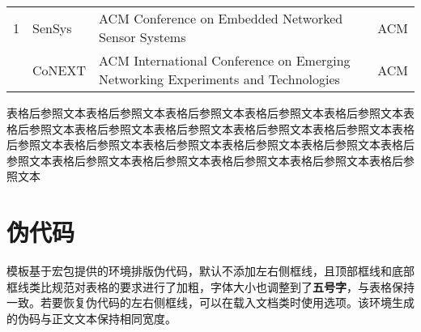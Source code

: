 \documentclass[doctor, vlined]{DissertUESTC}
\begin{document}
\begin{longtable}{m{2em}<{\centering} p{4.5em} p{15em} p{6em}}
		1 & SenSys & ACM Conference on Embedded Networked Sensor Systems & ACM \\
		\pagebreak  %
		2 & CoNEXT & ACM International Conference on Emerging Networking Experiments and Technologies & ACM \\
		
		
		
	\end{longtable}

	表格后参照文本表格后参照文本表格后参照文本表格后参照文本表格后参照文本表格后参照文本表格后参照文本表格后参照文本表格后参照文本表格后参照文本表格后参照文本表格后参照文本表格后参照文本表格后参照文本表格后参照文本表格后参照文本表格后参照文本表格后参照文本表格后参照文本表格后参照文本表格后参照文本
	
	\clearpage
	\section{伪代码}
	
	模板基于\href{https://mirrors.sustech.edu.cn/CTAN/macros/latex/contrib/algorithm2e/doc/algorithm2e.pdf}{\ttfamily\color{DarkRed}}宏包提供的环境排版伪代码，默认不添加左右侧框线，且顶部框线和底部框线类比规范对表格的要求进行了加粗，字体大小也调整到了\textbf{五号字}，与表格保持一致。若要恢复伪代码的左右侧框线，可以在载入文档类时使用选项。该环境生成的伪码与正文文本保持相同宽度。
	
\end{document}
